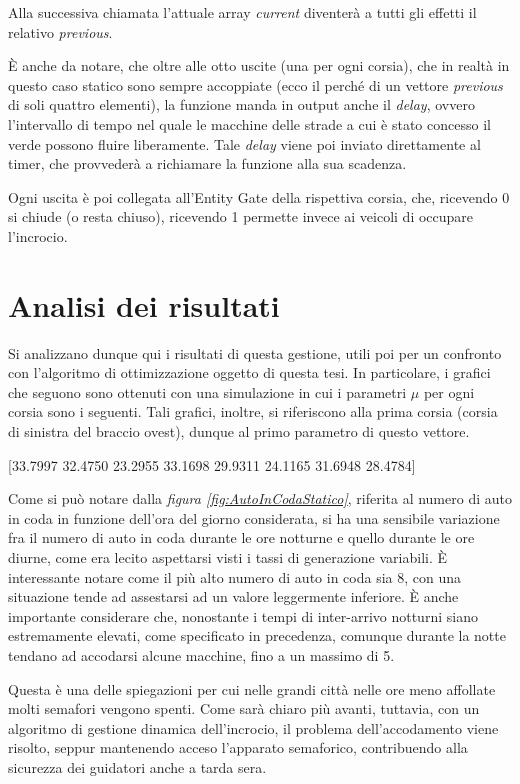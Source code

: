 Alla successiva chiamata l’attuale array \textit{current} diventerà a tutti gli effetti il relativo \textit{previous}.

È anche da notare, che oltre alle otto uscite (una per ogni corsia), che in realtà in questo caso statico sono sempre accoppiate (ecco il perché di un vettore \textit{previous} di soli quattro elementi), la funzione manda in output anche il \textit{delay}, ovvero l’intervallo di tempo nel quale le macchine delle strade a cui è stato concesso il verde possono fluire liberamente. Tale \textit{delay} viene poi inviato direttamente al timer, che provvederà a richiamare la funzione alla sua scadenza.

Ogni uscita è poi collegata all’Entity Gate della rispettiva corsia, che, ricevendo 0 si chiude (o resta chiuso), ricevendo 1 permette invece ai veicoli di occupare l’incrocio.
\newpage
\section{Analisi dei risultati}
Si analizzano dunque qui i risultati di questa gestione, utili poi per un confronto con l’algoritmo di ottimizzazione oggetto di questa tesi. In particolare, i grafici che seguono sono ottenuti con una simulazione in cui i parametri $\mu$ per ogni corsia sono i seguenti. Tali grafici, inoltre, si riferiscono alla prima corsia (corsia di sinistra del braccio ovest), dunque al primo parametro di questo vettore.

\begin{center}
	[33.7997   32.4750   23.2955   33.1698   29.9311   24.1165   31.6948   28.4784]
\end{center}

Come si può notare dalla \textit{figura \ref{fig:AutoInCodaStatico}}, riferita al numero di auto in coda in funzione dell’ora del giorno considerata, si ha una sensibile variazione fra il numero di auto in coda durante le ore notturne e quello durante le ore diurne, come era lecito aspettarsi visti i tassi di generazione variabili. È interessante notare come il più alto numero di auto in coda sia 8, con una situazione tende ad assestarsi ad un valore leggermente inferiore. È anche importante considerare che, nonostante i tempi di inter-arrivo notturni siano estremamente elevati, come specificato in precedenza, comunque durante la notte tendano ad accodarsi alcune macchine, fino a un massimo di 5.

Questa è una delle spiegazioni per cui nelle grandi città nelle ore meno affollate molti semafori vengono spenti. Come sarà chiaro più avanti, tuttavia, con un algoritmo di gestione dinamica dell’incrocio, il problema dell’accodamento viene risolto, seppur mantenendo acceso l’apparato semaforico, contribuendo alla sicurezza dei guidatori anche a tarda sera.

